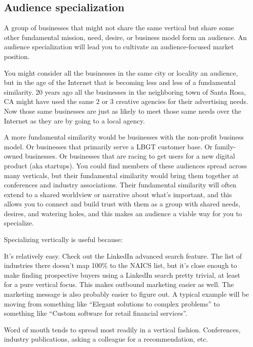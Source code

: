 \subsection{Audience specialization}

A group of businesses that might not share the same vertical but share some other fundamental mission, need, desire, or business model form an audience. An audience specialization will lead you to cultivate an audience-focused market position.

You might consider all the businesses in the same city or locality an audience, but in the age of the Internet that is becoming less and less of a fundamental similarity. 20 years ago all the businesses in the neighboring town of Santa Rosa, CA might have used the same 2 or 3 creative agencies for their advertising needs. Now those same businesses are just as likely to meet those same needs over the Internet as they are by going to a local agency.

A more fundamental similarity would be businesses with the non-profit business model. Or businesses that primarily serve a LBGT customer base. Or family-owned businesses. Or businesses that are racing to get users for a new digital product (aka startups). You could find members of these audiences spread across many verticals, but their fundamental similarity would bring them together at conferences and industry associations. Their fundamental similarity will often extend to a shared worldview or narrative about what's important, and this allows you to connect and build trust with them as a group with shared needs, desires, and watering holes, and this makes an audience a viable way for you to specialize.

Specializing vertically is useful because:

It's relatively easy. Check out the LinkedIn advanced search feature. The list of industries there doesn't map 100\% to the NAICS list, but it's close enough to make finding prospective buyers using a LinkedIn search pretty trivial, at least for a pure vertical focus. This makes outbound marketing easier as well. The marketing message is also probably easier to figure out. A typical example will be moving from something like ``Elegant solutions to complex problems'' to something like ``Custom software for retail financial services''.

Word of mouth tends to spread most readily in a vertical fashion. Conferences, industry publications, asking a colleague for a recommendation, etc.

